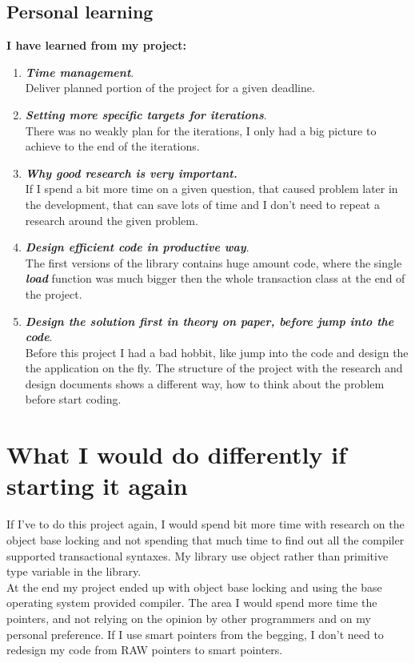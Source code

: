 \documentclass[12pt]{article}
\begin{document}
\subsection{Personal learning}
\textbf{I have learned from my project:}
\begin{enumerate}
\item \textit{\textbf{Time management}}.\\
Deliver planned portion of the project for a given deadline. 
\item \textit{\textbf{Setting more specific targets for iterations}}.\\
There was no weakly plan for the iterations, I only had a big picture to achieve to the end of the iterations. 
\item \textit{\textbf{Why good research is very important.}}\\
If I spend a bit more time on a given question, that caused problem later in the development, that can save lots of time and I don't need to repeat a research around the given problem. 
\item \textit{\textbf{Design efficient code in productive way}}.\\
The first versions of the library contains huge amount code, where the single \textit{\textbf{load}} function was much bigger then the whole transaction class at the end of the project.
\item \textit{\textbf{Design the solution first in theory on paper, before jump into the code}}.\\
Before this project I had a bad hobbit, like jump into the code and design the the application on the fly. The structure of the project with the research and design documents shows a different way, how to think about the problem before start coding.     
\end{enumerate}

\section{What I would do differently if starting it again}
If I've to do this project again, I would spend bit more time with research on the object base locking and not spending that much time to find out all the compiler supported transactional syntaxes. My library use object rather than primitive type variable in the  library.\\

At the end my project ended up with object base locking and using the base operating system provided compiler. The area I would spend more time the pointers, and not relying on the opinion by other programmers and on my personal preference. If I use smart pointers from the begging, I don't need to redesign my code from RAW pointers to smart pointers.\\
\end{document}
